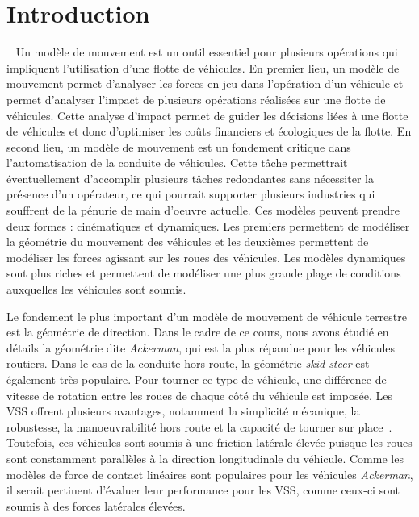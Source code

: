 \section{Introduction}~\label{sec:intro}
Un modèle de mouvement est un outil essentiel pour plusieurs opérations qui impliquent l'utilisation d'une flotte de véhicules.
En premier lieu, un modèle de mouvement permet d'analyser les forces en jeu dans l'opération d'un véhicule et permet d'analyser l'impact de plusieurs opérations réalisées sur une flotte de véhicules.
Cette analyse d'impact permet de guider les décisions liées à une flotte de véhicules et donc d'optimiser les coûts financiers et écologiques de la flotte.
En second lieu, un modèle de mouvement est un fondement critique dans l'automatisation de la conduite de véhicules. 
Cette tâche permettrait éventuellement d'accomplir plusieurs tâches redondantes sans nécessiter la présence d'un opérateur, ce qui pourrait supporter plusieurs industries qui souffrent de la pénurie de main d'oeuvre actuelle.
Ces modèles peuvent prendre deux formes : cinématiques et dynamiques.
Les premiers permettent de modéliser la géométrie du mouvement des véhicules et les deuxièmes permettent de modéliser les forces agissant sur les roues des véhicules.
Les modèles dynamiques sont plus riches et permettent de modéliser une plus grande plage de conditions auxquelles les véhicules sont soumis. 

Le fondement le plus important d'un modèle de mouvement de véhicule terrestre est la géométrie de direction. 
Dans le cadre de ce cours, nous avons étudié en détails la géométrie dite \textit{Ackerman}, qui est la plus répandue pour les véhicules routiers.
Dans le cas de la conduite hors route, la géométrie \textit{skid-steer} est également très populaire.
Pour tourner ce type de véhicule, une différence de vitesse de rotation entre les roues de chaque côté du véhicule est imposée. 
Les \ac{VSS} offrent plusieurs avantages, notamment la simplicité mécanique, la robustesse, la manoeuvrabilité hors route et la capacité de tourner sur place~\citep{Shamah2001}.
Toutefois, ces véhicules sont soumis à une friction latérale élevée puisque les roues sont constamment parallèles à la direction longitudinale du véhicule. 
Comme les modèles de force de contact linéaires sont populaires pour les véhicules \textit{Ackerman}, il serait pertinent d'évaluer leur performance pour les \ac{VSS}, comme ceux-ci sont soumis à des forces latérales élevées.

